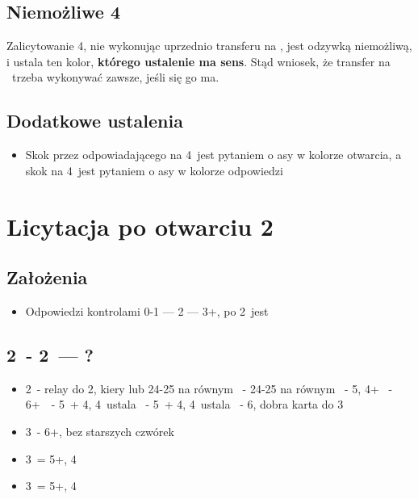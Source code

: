 \documentclass[12pt, a4paper]{article}
\begin{document}
\subsection{Niemożliwe 4\diams}
Zalicytowanie 4\diams, nie wykonując uprzednio transferu na \diams, jest odzywką niemożliwą, i ustala
ten kolor, \textbf{którego ustalenie ma sens}. Stąd wniosek, że transfer na \diams\ trzeba wykonywać zawsze, 
jeśli się go ma.

\subsection{Dodatkowe ustalenia}
\begin{itemize}
    \item Skok przez odpowiadającego na 4\clubs\ jest pytaniem o asy w kolorze otwarcia,
    a skok na 4\diams\ jest pytaniem o asy w kolorze odpowiedzi
\end{itemize}

\pagebreak
\section{Licytacja po otwarciu 2\clubs}
\subsection{Założenia}
\begin{itemize}
    \item Odpowiedzi kontrolami 0-1 --- 2 --- 3+, po 2\major\ jest \gf
\end{itemize}

\subsection{2\clubs\ - 2\diams\ --- ?}
\begin{itemize}
    \item 2\hearts\ - relay do 2\spades, kiery lub 24-25 na równym
    \nt\ - 24-25 na równym
    \clubs\ - 5\hearts, 4+\diams
    \diams\ - 6+\hearts\
    \hearts\ - 5\hearts\ + 4\spades, 4\clubs\ ustala \hearts
    \spades\ - 5\hearts\ + 4\clubs, 4\diams\ ustala \hearts
    \subitem 3\nt\ - 6\hearts 332, dobra karta do 3\nt
    \item 3\diams\ - 6+\diams, bez starszych czwórek
    \item 3\hearts\ = 5+\diams, 4\hearts
    \item 3\spades\ = 5+\diams, 4\spades
\end{itemize}
\end{document}
